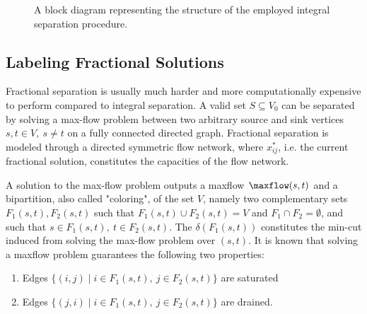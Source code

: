 \begin{figure}[ht]
	\centering
	\caption{A block diagram representing the structure of the employed integral separation procedure.}
	\label{fig:integral-separation-block-diagram}
\end{figure}

\subsection{Labeling Fractional Solutions}
\label{sec:impl-labeling-fractional-solutions}

Fractional separation is usually much harder and more computationally expensive to perform compared to integral separation.
A valid set $S \subseteq V_0$ can be separated by solving a max-flow problem between two arbitrary source and sink vertices $s, t \in V,\ s \ne t$ on a fully connected directed graph.
Fractional separation is modeled through a directed symmetric flow network, where $x^*_{ij}$, i.e. the current fractional solution, constitutes the capacities of the flow network.

A solution to the max-flow problem outputs a maxflow $\maxflow(s, t)$ and a bipartition, also called "coloring", of the set $V$, namely two complementary sets $F_1(s, t), F_2(s, t)$ such that $F_1(s, t) \cup F_2(s, t) = V$ and $F_1 \cap F_2 = \emptyset$, and such that $s \in F_1(s, t),\ t \in F_2(s, t)$.
The $\delta(F_1(s, t))$ constitutes the min-cut induced from solving the max-flow problem over $(s, t)$.
It is known that solving a maxflow problem guarantees the following two properties:

\begin{enumerate}
	\item Edges $\{ (i, j) \mid i \in F_1(s, t),\ j \in F_2(s, t) \}$ are saturated
	\item Edges $\{ (j, i) \mid i \in F_1(s, t),\ j \in F_2(s, t) \}$ are drained.
\end{enumerate}

